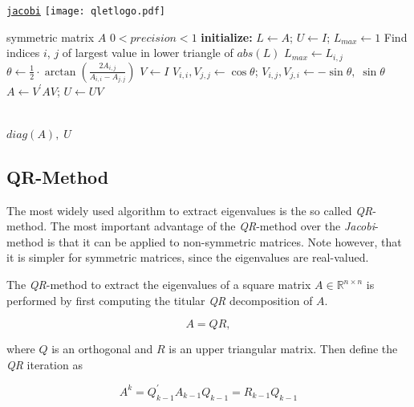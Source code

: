 \documentclass[12pt]{article}
\begin{document}
\begin{algorithm}
\caption{\href {https://github.com/thsis/NIS18/blob/master/algorithms/eigen.py}{\texttt{jacobi}}  \protect\texttt{[image: qletlogo.pdf]}}

\label{j-algo}
\begin{algorithmic}[1]
  \Require symmetric matrix $A$
  \Ensure $0 < precision < 1$
  \Statex \textbf{initialize: } $L \gets A$; $U \gets I$; $L_{max} \gets 1$
    \State Find indices $i$, $j$ of largest value in lower triangle of $abs(L)$
        \State $L_{max} \gets L_{i,j}$
            \State $\theta \gets \frac{1}{2}\cdot \arctan(\frac{2A_{i, j}}{A_{i, i}-A_{j, j}})$
    \State $V \gets I$
    \State $V_{i, i}, V_{j, j} \gets \cos \theta$; $V_{i, j}, V_{j, i} \gets -\sin \theta,\; \sin \theta$
    \State $A \gets V^{\prime} A V$; $U \gets UV$

  \EndWhile\\
  \Return $diag(A),\; U$
\end{algorithmic}
\end{algorithm}

\subsection{QR-Method}

The most widely used algorithm to extract eigenvalues is the so called \textit{QR}-method. The most important advantage of the \textit{QR}-method over the \textit{Jacobi}-method is that it can be applied to non-symmetric matrices. Note however, that it is simpler for symmetric matrices, since the eigenvalues are real-valued.

The \textit{QR}-method to extract the eigenvalues of a square matrix $A \in \mathbb{R}^{n \times n}$ is performed by first computing the titular \textit{QR} decomposition of $A$.

\begin{equation}
\label{qr_a}
A = QR,
\end{equation}

where $Q$ is an orthogonal and $R$ is an upper triangular matrix. Then define the \textit{QR} iteration as

\begin{equation}
\label{qr-method}
  A^k = Q_{k-1}^{\prime} A_{k-1} Q_{k-1} = R_{k-1}Q_{k-1}
\end{equation}
\end{document}
